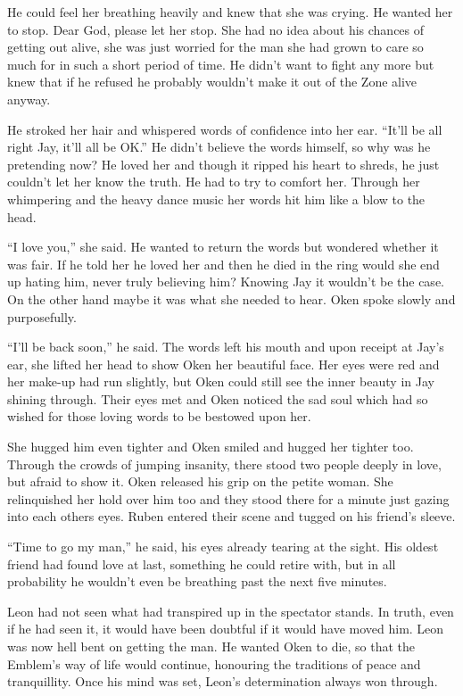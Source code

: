 He could feel her breathing heavily and knew that she was crying.  He wanted her to stop.  Dear God, please let her stop.  She had no idea about his chances of getting out alive, she was just worried for the man she had grown to care so much for in such a short period of time.  He didn't want to fight any more but knew that if he refused he probably wouldn't make it out of the Zone alive anyway.

He stroked her hair and whispered words of confidence into her ear.  ``It'll be all right Jay, it'll all be OK.''  He didn't believe the words himself, so why was he pretending now?  He loved her and though it ripped his heart to shreds, he just couldn't let her know the truth.  He had to try to comfort her.  Through her whimpering and the heavy dance music her words hit him like a blow to the head.

``I love you,'' she said.  He wanted to return the words but wondered whether it was fair.  If he told her he loved her and then he died in the ring would she end up hating him, never truly believing him?  Knowing Jay  it wouldn't be the case.  On the other hand maybe it was what she needed to hear.  Oken spoke slowly and purposefully. 

``I'll be back soon,'' he said.  The words left his mouth and upon receipt at Jay's ear, she lifted her head to show Oken her beautiful face.  Her eyes were red and her make-up had run slightly, but Oken could still see the inner beauty in Jay shining through.  Their eyes met and Oken noticed the sad soul which had so wished for those loving words to be bestowed upon her.

She hugged him even tighter and Oken smiled and hugged her tighter too.  Through the crowds of jumping insanity, there stood two people deeply in love, but afraid to show it.  Oken released his grip on the petite woman.  She relinquished her hold over him too and they stood there for a minute just gazing into each others eyes.  Ruben entered their scene and tugged on his friend's sleeve.

``Time to go my man,'' he said, his eyes already tearing at the sight.  His oldest friend had found love at last, something he could retire with, but in all probability he wouldn't even be breathing past the next five minutes.



\thoughtbreak



Leon had not seen what had transpired up in the spectator stands.  In truth, even if he had seen it, it would have been doubtful if it would have moved him.  Leon was now hell bent on getting the man.  He wanted Oken to die, so that the Emblem's way of life would continue, honouring the traditions of peace and tranquillity.  Once his mind was set, Leon's determination always won through.

